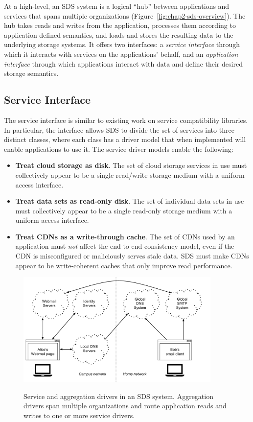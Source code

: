 At a high-level, an SDS system is a logical ``hub'' between applications and
services that spans multiple organizations (Figure~\ref{fig:chap2-sds-overview}). 
The hub takes reads and writes from the application, processes them
according to application-defined semantics, and loads and stores the resulting
data to the underlying storage systems.
It offers two interfaces:  a \emph{service interface} through which it interacts with
services on the applications' behalf, and an \emph{application interface} through
which applications interact with data and define their desired storage
semantics.

\subsection{Service Interface}

The service interface is similar to existing work on service compatibility
libraries.  In particular, the interface allows SDS to divide the set of
services into three distinct classes, where each class has a driver model that
when implemented will enable applications to use it.  The service driver models
enable the following:

\begin{itemize}
   \item \textbf{Treat cloud storage as disk}.  The set of cloud storage
      services in use must collectively appear to be a single
      read/write storage medium with a uniform access interface.
   \item \textbf{Treat data sets as read-only disk}.  The set of individual
      data sets in use must collectively appear to be a single read-only
      storage medium with a uniform access interface.
   \item \textbf{Treat CDNs as a write-through cache}.  The set of CDNs used by an
      application must \emph{not} affect the end-to-end consistency model, even if the
      CDN is misconfigured or maliciously serves stale data.  SDS must make CDNs
      appear to be write-coherent caches that only improve read performance.
\end{itemize}


\begin{figure}[h]
   \caption{Service and aggregation drivers in an SDS system.  Aggregation
   drivers span multiple organizations and route application reads and writes to
   one or more service drivers.}
   \centering
   \includegraphics[width=0.9\textwidth,page=3]{figures/dissertation-figures}
   \label{fig:chap2-driver-overview}
\end{figure}


